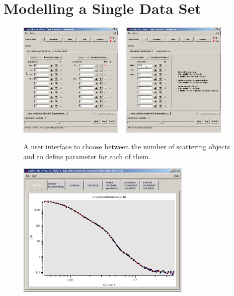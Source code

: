 \clearpage
\section{Modelling a Single Data Set}


\begin{figure}[htb]
\begin{center}
\includegraphics[width=0.45\textwidth,height=0.55\textwidth]{analyticalMenu1.png}
~\hspace{3mm}
\includegraphics[width=0.45\textwidth,height=0.55\textwidth]{analyticalMenu2.png}
\end{center}
\caption{A user interface to choose between the number of scattering
objects and to define parameter for each of them.}
 \label{analyticalMenu}
\end{figure}


\begin{figure}[htb]
\begin{center}
\includegraphics[width=0.75\textwidth,height=0.55\textwidth]{sasfit_1.png}
\end{center}
\caption{} \label{fig1}
\end{figure}

